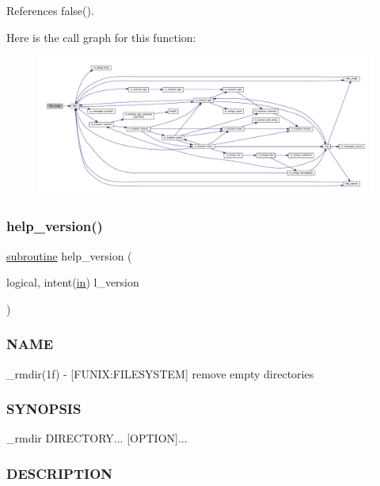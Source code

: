 References false().

Here is the call graph for this function\+:
\nopagebreak
\begin{figure}[H]
\begin{center}
\leavevmode
\includegraphics[width=350pt]{__rmdir_8f90_a3e09a3b52ee8fb04eeb93fe5761626a8_cgraph}
\end{center}
\end{figure}
\mbox{\label{__rmdir_8f90_a39c21619b08a3c22f19e2306efd7f766}} 
\subsubsection{\texorpdfstring{help\+\_\+version()}{help\_version()}}
{\footnotesize\ttfamily \hyperlink{M__stopwatch_83_8txt_acfbcff50169d691ff02d4a123ed70482}{subroutine} help\+\_\+version (\begin{DoxyParamCaption}\item[{logical, intent(\hyperlink{M__journal_83_8txt_afce72651d1eed785a2132bee863b2f38}{in})}]{l\+\_\+version }\end{DoxyParamCaption})}



\subsubsection*{N\+A\+ME}

\+\_\+rmdir(1f) -\/ \mbox{[}F\+U\+N\+IX\+:F\+I\+L\+E\+S\+Y\+S\+T\+EM\mbox{]} remove empty directories \subsubsection*{S\+Y\+N\+O\+P\+S\+IS}

\+\_\+rmdir D\+I\+R\+E\+C\+T\+O\+RY... \mbox{[}O\+P\+T\+I\+ON\mbox{]}... \subsubsection*{D\+E\+S\+C\+R\+I\+P\+T\+I\+ON}

